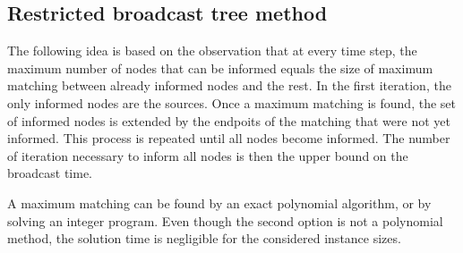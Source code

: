 %
%
%
\subsection{Restricted broadcast tree method}

The following idea is based on the observation that at every time step, the maximum number of nodes that can be informed equals the size of maximum matching between already informed nodes and the rest.
In the first iteration, the only informed nodes are the sources.
Once a maximum matching is found, the set of informed nodes is extended by the endpoits of the matching that were not yet informed.
This process is repeated until all nodes become informed.
The number of iteration necessary to inform all nodes is then the upper bound on the broadcast time.

A maximum matching can be found by an exact polynomial algorithm, or by solving an integer program.
Even though the second option is not a polynomial method, the solution time is negligible for the considered instance sizes.

